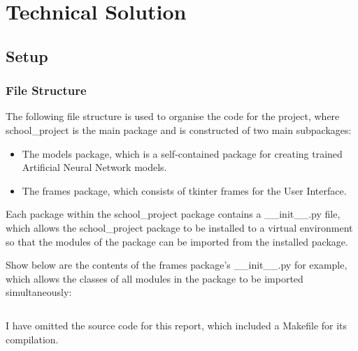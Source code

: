 \documentclass[./project-report/src/latex/project-report.tex]{subfiles}
\begin{document}
\maketitle

\clearpage
\section{Technical Solution}

\subsection{Setup}

\subsubsection{File Structure}

The following file structure is used to organise the code for the project, where school\_project is the main package and is constructed of two main subpackages:

\begin{itemize}
    \item The models package, which is a self-contained package for creating trained Artificial Neural Network models.
    \item The frames package, which consists of tkinter frames for the User Interface.
\end{itemize}

\pagebreak

\begin{footnotesize}

\end{footnotesize}

\pagebreak

Each package within the school\_project package contains a \_\_init\_\_.py file, which allows the school\_project package to be installed to a virtual environment 
so that the modules of the package can be imported from the installed package.

Show below are the contents of the frames package's \_\_init\_\_.py for example, which allows the classes of all modules in the package to be imported simultaneously:
\inputminted{python}{./school_project/frames/__init__.py}

I have omitted the source code for this report, which included a Makefile for its compilation.
\end{document}

